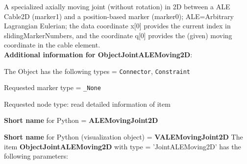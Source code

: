 \label{sec:item:ObjectJointALEMoving2D}
A specialized axially moving joint (without rotation) in 2D between a ALE Cable2D (marker1) and a position-based marker (marker0); ALE=Arbitrary Lagrangian Eulerian; the data coordinate x[0] provides the current index in slidingMarkerNumbers, and the  coordinate q[0] provides the (given) moving coordinate in the cable element.\vspace{12pt}
 \\{\bf Additional information for ObjectJointALEMoving2D}:
\bi
  \item The Object has the following types = \texttt{Connector}, \texttt{Constraint}
  \item Requested marker type = \texttt{\_None}
  \item Requested node type: read detailed information of item
  \item {\bf Short name} for Python = {\bf ALEMovingJoint2D}  \item {\bf Short name} for Python (visualization object) = {\bf VALEMovingJoint2D}\ei
\vspace{12pt} \noindent The item {\bf ObjectJointALEMoving2D} with type = 'JointALEMoving2D' has the following parameters:\vspace{-1cm}\\ 
